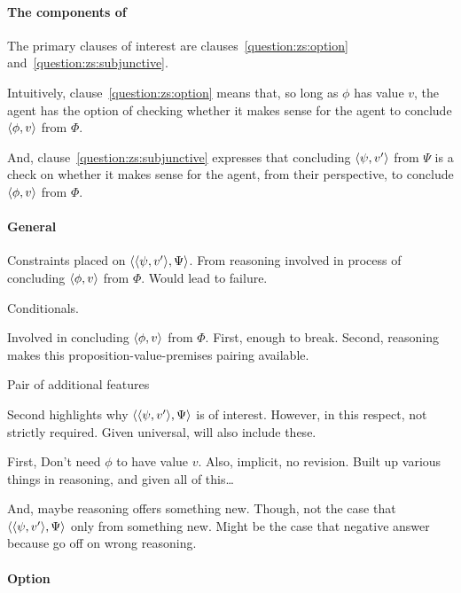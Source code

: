 \paragraph{The components of \qzS{}}

\begin{note}
  The primary clauses of interest are clauses~\ref{question:zs:option} and~\ref{question:zs:subjunctive}.

  Intuitively, clause~\ref{question:zs:option} means that, so long as \(\phi\) has value \(v\), the agent has the option of checking whether it makes sense for the agent to conclude \(\langle \phi, v \rangle\) from \(\Phi\).
\end{note}
  And, clause~\ref{question:zs:subjunctive} expresses that concluding \(\langle \psi, v' \rangle\) from \(\Psi\) is a check on whether it makes sense for the agent, from their perspective, to conclude \(\langle \phi, v \rangle\) from \(\Phi\).

\paragraph{General}

\begin{note}
  Constraints placed on \(\langle \langle \psi, v' \rangle, \Psi \rangle\).
  From reasoning involved in process of concluding \(\langle \phi, v \rangle\) from \(\Phi\).
  Would lead to failure.

  Conditionals.

  Involved in concluding \(\langle \phi, v \rangle\) from \(\Phi\).
  First, enough to break.
  Second, reasoning makes this proposition-value-premises pairing available.

  Pair of additional features

  Second highlights why \(\langle \langle \psi, v' \rangle, \Psi \rangle\) is of interest.
  However, in this respect, not strictly required.
  Given universal, will also include these.

  First,
  Don't need \(\phi\) to have value \(v\).
  Also, implicit, no revision.
  Built up various things in reasoning, and given all of this\dots


  And, maybe reasoning offers something new.
  Though, not the case that \(\langle \langle \psi, v' \rangle, \Psi \rangle\) only from something new.
  Might be the case that negative answer because go off on wrong reasoning.
\end{note}

\paragraph{Option}

